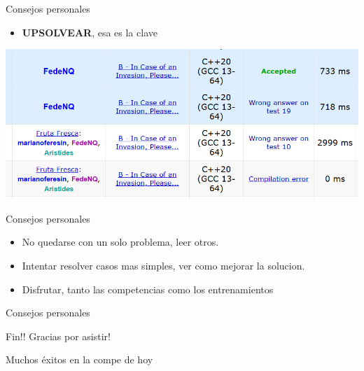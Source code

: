 \documentclass{beamer}
\begin{document}
\begin{frame}[fragile]{Consejos personales}
  \begin{itemize}
  \item \textbf{UPSOLVEAR}, esa es la clave
  \end{itemize}
  \includegraphics[width=1\textwidth,keepaspectratio]{fotos/uplsoving.png}
  
\end{frame}


\begin{frame}[fragile]{Consejos personales}
  \begin{itemize}
  \item No quedarse con un solo problema, leer otros.
  \item Intentar resolver casos mas simples, ver como mejorar la solucion.
  \item Disfrutar, tanto las competencias como los entrenamientos
  \end{itemize}
  
\end{frame}

\begin{frame}[fragile]{Consejos personales}

  Fin!!
  Gracias por asistir! 

  Muchos éxitos en la compe de hoy
  
\end{frame}
\end{document}
